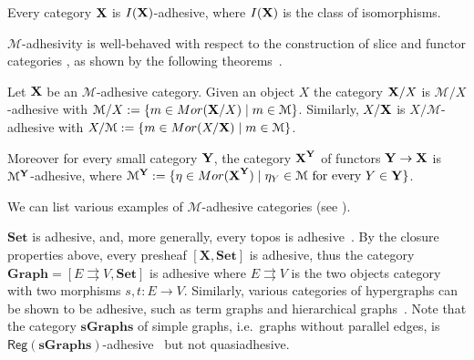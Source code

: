\documentclass[a4paper,UKenglish,cleveref,pdftex,thm-restate,numberwithinsect]{lipics-v2021}
\newcommand{\mor}{\mathsf{Mor}}
\newcommand{\reg}{\mathsf{Reg}}
\newcommand{\cat}[1]{\ensuremath{\mathbf{#1}}}
\def\A{\textbf {\textup{A}}}
\def\B{\textbf {\textup{B}}}
\def\C{\textbf {\textup{C}}}
\def\X{\textbf {\textup{X}}}
\def\Y{\textbf {\textup{Y}}}
\newcommand{\comma}[2]{#1\hspace{1pt} {\downarrow}\hspace{1pt} #2}
\newcommand{\cma}[2]{\mathcal{#1}\hspace{1pt} {\downarrow}\hspace{1pt} \mathcal{#2}}
\begin{document}
\begin{example}
  \label{rem:iso}
  Every category $\X$ is $\mathsf{I(\X)}$-adhesive, where $\mathsf{I(\X)}$ is the class of 
  isomorphisms.
\end{example}

$\mathcal{M}$-adhesivity is well-behaved with respect to  the construction of slice and functor categories \cite{mac2013categories}, as shown by the following theorems~\cite{ehrig2006fundamentals,lack2005adhesive}.


\begin{theorem}
  \label{thm:slice-functors}
  Let $\X$ be an $\mathcal{M}$-adhesive category. Given an object $X$
  the category $\X/X$ is $\mathcal{M}/X$-adhesive with
  $\mathcal{M}/X:=\{m\in \mor(\X/X) \mid m\in
  \mathcal{M}\}$. Similarly, $X/\X$ is $X/\mathcal{M}$-adhesive with
  $X/\mathcal{M}:=\{m\in \mor(X/\X) \mid m\in \mathcal{M}\}$.
  
  Moreover for every small category $\Y$, the category $\X^\Y$ of
  functors $\Y\to \X$ is $\mathcal{M}^{\Y}$-adhesive, where
  $\mathcal{M}^{\Y}:=\{\eta \in \mor(\X^\Y) \mid \eta_Y \in
    \mathcal{M} \text{ for every } Y\in \Y\}$.
\end{theorem}

We can list various examples of $\mathcal{M}$-adhesive categories (see
\cite{castelnovo2023thesis,CastelnovoGM22,lack2006toposes}).


\begin{example}
  \label{ex:adhesive}
  $\cat{Set}$ is adhesive, and, more generally, every topos is
  adhesive~\cite{lack2006toposes}. By the closure properties above, every presheaf $[\cat{X},\cat{Set}]$ is adhesive, thus the category
  $\cat{Graph} = [ E \rightrightarrows V, \cat{Set}]$ is adhesive
  where $E \rightrightarrows {V}$ is the two objects category with two
  morphisms $s,t \colon{E} \to {V}$. Similarly, various
  categories of hypergraphs can be shown to be adhesive, such as term
  graphs and hierarchical graphs~\cite{CastelnovoGM24}. Note that the category $\cat{sGraphs}$ of simple graphs, 
  i.e.~graphs without parallel edges, is
  $\reg{(\cat{sGraphs})}$-adhesive~\cite{BehrHK23} but not
  quasiadhesive.
\end{example}
\end{document}
